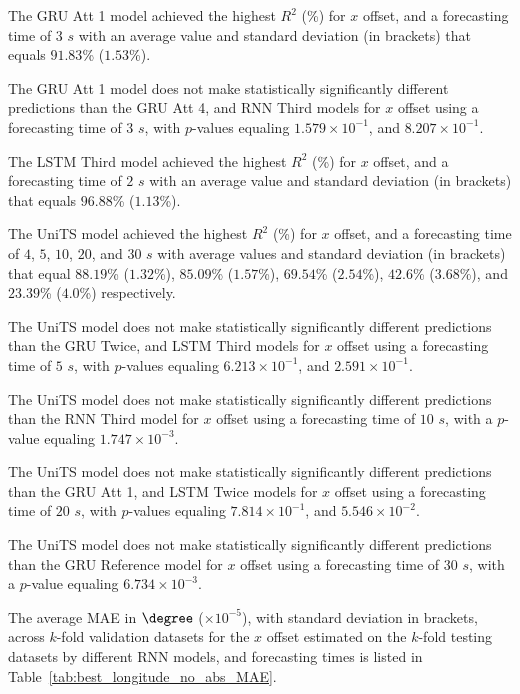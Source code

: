 The GRU Att 1 model achieved the highest $R^{2}$ (\%) for $x$ offset, and a forecasting time of $3$ $s$ with an average value and standard deviation (in brackets) that equals $91.83$\% ($1.53$\%).

The GRU Att 1 model does not make statistically significantly different predictions than the GRU Att 4, and RNN Third models for $x$ offset using a forecasting time of $3$ $s$, with $p$-values equaling $1.579 \times 10^{-1}$, and $8.207 \times 10^{-1}$.

The LSTM Third model achieved the highest $R^{2}$ (\%) for $x$ offset, and a forecasting time of $2$ $s$ with an average value and standard deviation (in brackets) that equals $96.88$\% ($1.13$\%).

The UniTS model achieved the highest $R^{2}$ (\%) for $x$ offset, and a forecasting time of $4$, $5$, $10$, $20$, and $30$ $s$ with average values and standard deviation (in brackets) that equal $88.19$\% ($1.32$\%), $85.09$\% ($1.57$\%), $69.54$\% ($2.54$\%), $42.6$\% ($3.68$\%), and $23.39$\% ($4.0$\%) respectively.

The UniTS model does not make statistically significantly different predictions than the GRU Twice, and LSTM Third models for $x$ offset using a forecasting time of $5$ $s$, with $p$-values equaling $6.213 \times 10^{-1}$, and $2.591 \times 10^{-1}$.

The UniTS model does not make statistically significantly different predictions than the RNN Third model for $x$ offset using a forecasting time of $10$ $s$, with a $p$-value equaling $1.747 \times 10^{-3}$.

The UniTS model does not make statistically significantly different predictions than the GRU Att 1, and LSTM Twice models for $x$ offset using a forecasting time of $20$ $s$, with $p$-values equaling $7.814 \times 10^{-1}$, and $5.546 \times 10^{-2}$.

The UniTS model does not make statistically significantly different predictions than the GRU Reference model for $x$ offset using a forecasting time of $30$ $s$, with a $p$-value equaling $6.734 \times 10^{-3}$.

The average MAE in $\degree$ ($\times 10^{-5}$), with standard deviation in brackets, across $k$-fold validation datasets for the $x$ offset estimated on the $k$-fold testing datasets by different RNN models, and forecasting times is listed in Table~\ref{tab:best_longitude_no_abs_MAE}.

